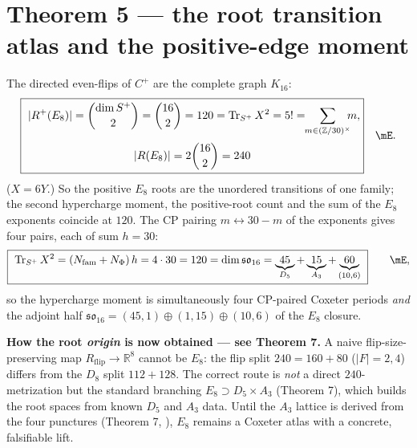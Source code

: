 \documentclass[11pt,a4paper]{article}
\theoremstyle{definition}
\begin{document}
\section*{Theorem 5 --- the root transition atlas and the positive-edge moment}
The directed even-flips of $C^+$ are the complete graph $K_{16}$:
\begin{equation}
  \boxed{\ \begin{gathered}
  |R^+(E_8)|=\binom{\dim S^+}{2}=\binom{16}{2}=120=\operatorname{Tr}_{S^+}X^2=5!=\!\!\sum_{m\in(\mathbb Z/30)^\times}\!\!\!m,\\[2pt]
  |R(E_8)|=2\binom{16}{2}=240\ \end{gathered}}\quad\mE .
\end{equation}
($X=6Y$.) So the positive $E_8$ roots are the unordered transitions of one family; the second
hypercharge moment, the positive-root count and the sum of the $E_8$ exponents coincide at $120$.
The CP pairing $m\leftrightarrow 30-m$ of the exponents gives four pairs, each of sum $h=30$:
\begin{equation}
  \boxed{\ \operatorname{Tr}_{S^+}X^2=(N_{\mathrm{fam}}+N_\Phi)\,h=4\cdot30=120=\dim\mathfrak{so}_{16}=\underbrace{45}_{D_5}+\underbrace{15}_{A_3}+\underbrace{60}_{(10,6)}\ }\qquad\mE ,
\end{equation}
so the hypercharge moment is simultaneously four CP-paired Coxeter periods \emph{and} the adjoint
half $\mathfrak{so}_{16}=(45,1)\oplus(1,15)\oplus(10,6)$ of the $E_8$ closure.
\par\smallskip\noindent\textbf{How the root \emph{origin} is now obtained --- see Theorem 7.}
A naive flip-size-preserving map $R_{\mathrm{flip}}\to\mathbb R^8$ cannot be $E_8$: the flip split
$240=160+80$ ($|F|=2,4$) differs from the $D_8$ split $112+128$. The correct route is \emph{not} a
direct $240$-metrization but the standard branching $E_8\supset D_5\times A_3$ (Theorem 7), which
builds the root spaces from known $D_5$ and $A_3$ data. Until the $A_3$ lattice is derived from the
four punctures (Theorem 7, \mO), $E_8$ remains a Coxeter atlas with a concrete, falsifiable lift.
\par\smallskip

\end{document}
